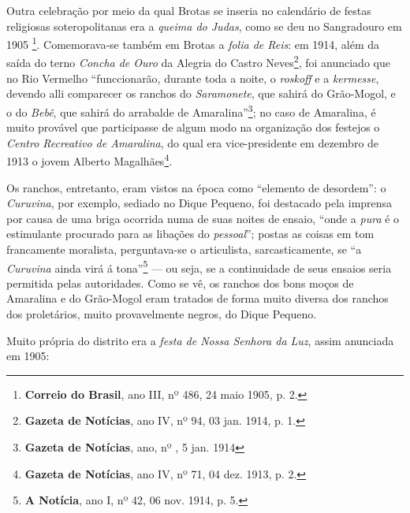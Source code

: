 Outra celebração por meio da qual Brotas se inseria no calendário de festas religiosas soteropolitanas era a \textit{queima do Judas}, como se deu no Sangradouro em 1905 \footnote{\textbf{Correio do Brasil}, ano III, nº 486, 24 maio 1905, p. 2.}. Comemorava-se também em Brotas a \textit{folia de Reis}: em 1914, além da saída do terno \textit{Concha de Ouro} da Alegria do Castro Neves\footnote{\textbf{Gazeta de Notícias}, ano IV, nº 94, 03 jan. 1914, p. 1.}, foi anunciado que no Rio Vermelho ``funccionarão, durante toda a noite, o \textit{roskoff} e a \textit{kermesse}, devendo alli comparecer os ranchos do \textit{Saramonete}, que sahirá do Grão-Mogol, e o do \textit{Bebê}, que sahirá do arrabalde de Amaralina''\footnote{\textbf{Gazeta de Notícias}, ano, nº , 5 jan. 1914}; no caso de Amaralina, é muito provável que participasse de algum modo na organização dos festejos o \textit{Centro Recreativo de Amaralina}, do qual era vice-presidente em dezembro de 1913 o jovem Alberto Magalhães\footnote{\textbf{Gazeta de Notícias}, ano IV, nº 71, 04 dez. 1913, p. 2.}.

Os ranchos, entretanto, eram vistos na época como ``elemento de desordem'': o \textit{Curuvina}, por exemplo, sediado no Dique Pequeno, foi destacado pela imprensa por causa de uma briga ocorrida numa de suas noites de ensaio, ``onde a \textit{pura} é o estimulante procurado para as libações do \textit{pessoal}''; postas as coisas em tom francamente moralista, perguntava-se o articulista, sarcasticamente, se ``a \textit{Curuvina} ainda virá á tona''\footnote{\textbf{A Notícia}, ano I, nº 42, 06 nov. 1914, p. 5.} --- ou seja, se a continuidade de seus ensaios seria permitida pelas autoridades. Como se vê, os ranchos dos bons moços de Amaralina e do Grão-Mogol eram tratados de forma muito diversa dos ranchos dos proletários, muito provavelmente negros, do Dique Pequeno.

Muito própria do distrito era a \textit{festa de Nossa Senhora da Luz}, assim anunciada em 1905:

